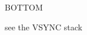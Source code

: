 \begin{Layer}{BOTTOM}
\begin{Sources}
\end{Sources}

\begin{GenEvent}
\genevent{\UpBlock}
\genevent{\UpCast}
\genevent{\UpExit}
\genevent{\UpFail}
\genevent{\UpStable}
\genevent{\UpMergeDenied}
\genevent{\UpMergeGranted}
\genevent{\UpMergeRequest}
\genevent{\UpSend}
\genevent{\UpSuspect}
\genevent{\UpTimer}
\genevent{\UpView}
\end{GenEvent}

\begin{Testing}
\item see the VSYNC stack
\end{Testing}
\end{Layer}
